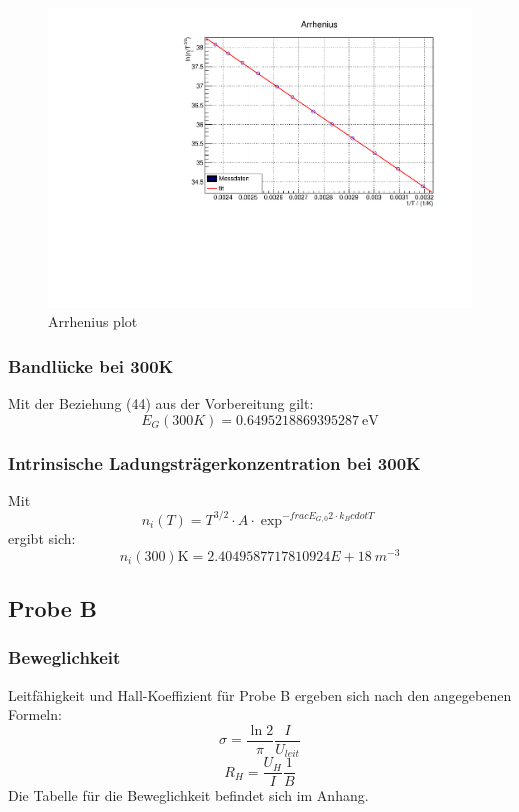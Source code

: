 \begin{figure}
\label{fig:leitin}
\centering
\includegraphics[scale = 0.5]{../data/A5.pdf}
\caption{Arrhenius plot}
\end{figure}


\subsubsection{Bandlücke bei 300K}
\FloatBarrier
Mit der Beziehung (44) aus der Vorbereitung gilt:
$$E_G(300K) = 0.6495218869395287 \ \text{eV}$$

\subsubsection{Intrinsische Ladungsträgerkonzentration bei 300K}
\FloatBarrier
Mit 
$$ n_i (T) = T^{3/2} \cdot A \cdot \exp^{- frac{E_{G,0}}{2 \cdot k_B }cdot T}$$
ergibt sich:
$$n_i(300) \text{K} = 2.4049587717810924E+18 \ m^{-3}$$

\subsection{Probe B}
\subsubsection{Beweglichkeit}
\FloatBarrier
Leitfähigkeit und Hall-Koeffizient für Probe B ergeben sich nach den angegebenen Formeln:
$$\sigma = \frac{\ln 2}{\pi} \frac{I}{U_{leit}}$$
$$R_H = \frac{U_H}{I} \frac{1}{B}$$
Die Tabelle für die Beweglichkeit befindet sich im Anhang.

